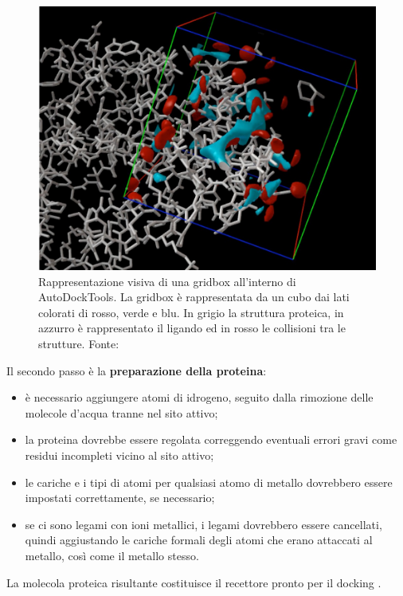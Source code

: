 \begin{figure}[H]
    \centering
    \includegraphics[scale=0.5]{images/chapter1/gridbox.jpg}
    \caption[Rappresentazione visiva di una gridbox in AutoDockTools]{Rappresentazione visiva di una gridbox all'interno di AutoDockTools. La gridbox è rappresentata da un cubo dai lati colorati di rosso, verde e blu. In grigio la struttura proteica, in azzurro è rappresentato il ligando ed in rosso le collisioni tra le strutture. Fonte: \cite{eberhardt_autodock_nodate}}
    \label{fig:gridbox}
\end{figure}

Il secondo passo è la \textbf{preparazione della proteina}: 
\begin{itemize}
    \item è necessario aggiungere atomi di idrogeno, seguito dalla rimozione delle molecole d'acqua tranne nel sito attivo;
    \item la proteina dovrebbe essere regolata correggendo eventuali errori gravi come residui incompleti vicino al sito attivo;
    \item le cariche e i tipi di atomi per qualsiasi atomo di metallo dovrebbero essere impostati correttamente, se necessario;
    \item se ci sono legami con ioni metallici, i legami dovrebbero essere cancellati, quindi aggiustando le cariche formali degli atomi che erano attaccati al metallo, così come il metallo stesso. 
\end{itemize}
La molecola proteica risultante costituisce il recettore pronto per il docking \cite{roy_chapter_2015}.

